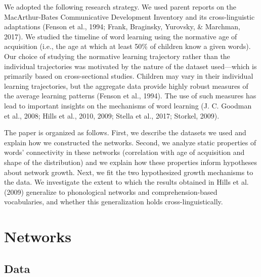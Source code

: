 \documentclass[english,floatsintext,man]{apa6}
\theoremstyle{definition}
\theoremstyle{definition}
\theoremstyle{definition}
\theoremstyle{remark}
\begin{document}
We adopted the following research strategy. We used parent reports on
the MacArthur-Bates Communicative Development Inventory and its
cross-linguistic adaptations (Fenson et al., 1994; Frank, Braginsky,
Yurovsky, \& Marchman, 2017). We studied the timeline of word learning
using the normative age of acquisition (i.e., the age at which at least
50\% of children know a given words). Our choice of studying the
normative learning trajectory rather than the individual trajectories
was motivated by the nature of the dataset used---which is primarily
based on cross-sectional studies. Children may vary in their individual
learning trajectories, but the aggregate data provide highly robust
measures of the average learning patterns (Fenson et al., 1994). The use
of such measures has lead to important insights on the mechanisms of
word learning (J. C. Goodman et al., 2008; Hills et al., 2010, 2009;
Stella et al., 2017; Storkel, 2009).

The paper is organized as follows. First, we describe the datasets we
used and explain how we constructed the networks. Second, we analyze
static properties of words' connectivity in these networks (correlation
with age of acquisition and shape of the distribution) and we explain
how these properties inform hypotheses about network growth. Next, we
fit the two hypothesized growth mechanisms to the data. We investigate
the extent to which the results obtained in Hills et al. (2009)
generalize to phonological networks and comprehension-based
vocabularies, and whether this generalization holds
cross-linguistically.

\section{Networks}\label{networks}

\subsection{Data}\label{data}
\end{document}
